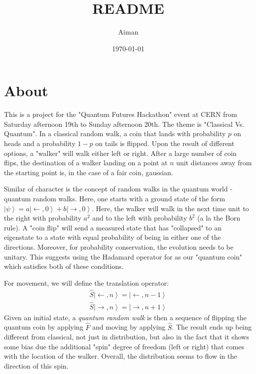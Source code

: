 \documentclass[11pt]{article}
\author{Aiman}
\date{\today}
\title{README}
\begin{document}
\maketitle
\tableofcontents



\section{About}
\label{sec-1}
This is a project for the "Quantum Futures Hackathon" event at CERN from Saturday afternoon 19th to Sunday afternoon 20th. The theme is "Classical Vs. Quantum". 
In a classical random walk, a coin that lands with probability $p$ on heads and a probability $1 - p$ on tails is flipped. Upon the result of different options, a "walker" will walk either left or right. After a large number of coin flips, the destination of a walker landing on a point at $n$ unit distances away from the starting point is, in the case of a fair coin, gaussian. 

Similar of character is the concept of random walks in the quantum world - quantum random walks. Here, one starts with a ground state of the form $\left|\psi \right> =  a\left|\leftarrow, 0\right> + b\left| \rightarrow, 0 \right>$. Here, the walker will walk in the next time unit to the right with probability $a^2$ and to the left with probability $b^2$ (a la the Born rule). A "coin flip" will send a measured state that has "collapsed" to an eigenstate to a state with equal probability of being in either one of the directions. Moreover, for probability conservation, the evolution needs to be unitary. This suggests using the Hadamard operator for as our "quantum coin" which satisfies both of these conditions.

For movement, we will define the translation operator:
\begin{align*}
 \hat{S}\left|\leftarrow, n \right> = \left|\leftarrow, n-1 \right>\\
 \hat{S}\left|\rightarrow, n \right> = \left|\rightarrow, n+1 \right>
\end{align*}
Given an initial state, a \emph{quantum random walk} is then a sequence of flipping the quantum coin by applying $\hat{F}$ and moving by applying $\hat{S}$. The result ends up being different from classical, not just in distribution, but also in the fact that it shows some bias due the additional "spin" degree of freedom (left or right) that comes with the location of the walker. Overall, the distribution seems to flow in the direction of this spin.
\end{document}
